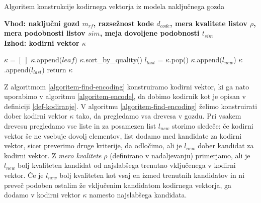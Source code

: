 \documentclass[12pt,a4paper,twoside]{article}
\theoremstyle{definition} %
\theoremstyle{plain} %
\numberwithin{equation}{section}  %
\begin{document}
\begin{algorithm}[h!]
  \caption{Algoritem konstrukcije kodirnega vektorja iz modela naključnega gozda}
  \label{algoritem-find-encoding}
  \raggedright
  \textbf{Vhod: naključni gozd $m_{rf}$, razsežnost kode $d_{code}$, mera kvalitete listov $\rho$, mera podobnosti listov $sim$, meja dovoljene podobnosti $t_{sim}$}  \\
  \textbf{Izhod: kodirni vektor $\kappa$} %
  \begin{algorithmic}[0]
	\State $\kappa = [\ ]$
				\State $\kappa$.append($leaf$)
			\EndIf
		\EndFor
	\EndFor
				\State $\kappa$.sort\_by\_quality()
				\State $l_{last}$ = $\kappa$.pop()
						\State $\kappa$.append$(l_{new}$)
					\Else
						\State $\kappa$.append$(l_{last}$)
					\EndIf
				\EndIf
			\EndIf
		\EndFor
	\EndFor	
	\State return $\kappa$
  \end{algorithmic}
\end{algorithm}

Z algoritmom \ref{algoritem-find-encoding} konstruiramo kodirni vektor, ki ga nato uporabimo v algoritmu \ref{algoritem-encode}, 
da dobimo kodirnik kot je opisan v definiciji \ref{def-kodiranje}.
V algoritmu \ref{algoritem-find-encoding} želimo konstruirati dober kodirni vektor $\kappa$ tako, da pregledamo vsa drevesa v gozdu. 
Pri vsakem drevesu pregledamo vse liste in za posamezen list $l_{new}$ storimo sledeče: 
če kodirni vektor še ne vsebuje dovolj elementov, list dodamo med kandidate za kodirni vektor, sicer preverimo druge kriterije, da odločimo, ali je $l_{new}$ dober kandidat za kodirni vektor. 
Z \emph{mero kvalitete} $\rho$ (definirano v nadaljevanju) primerjamo, ali je $l_{new}$ bolj kvaliteten kandidat od najslabšega trenutno vključenega v kodirni vektor. 
Če je $l_{new}$ bolj kvaliteten kot vsaj en izmed trenutnih kandidatov in ni preveč podoben ostalim že vključenim kandidatom kodirnega vektorja, ga dodamo v kodirni vektor $\kappa$ namesto najslabšega kandidata.
\end{document}
